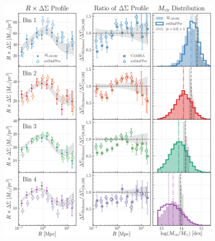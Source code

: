 \documentclass[fleqn,usenatbib,useAMS,english]{mnras}
\begin{document}
  \begin{figure}
      \centering
      \includegraphics[width=\textwidth]{figure/topn_dsigma_mout6_redm_compare}
      \caption{
          }
      \label{fig:mout_richness}
  \end{figure}
\end{document}
